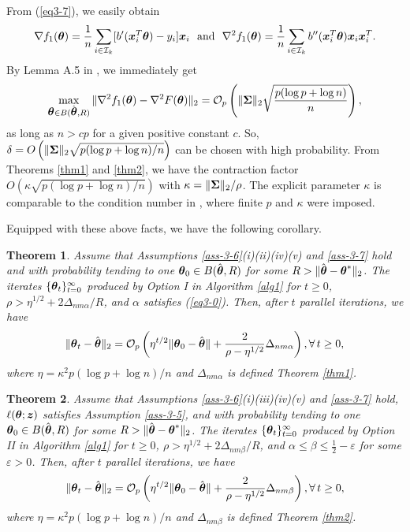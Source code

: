 \documentclass[12pt,a4paper]{article}%
\newtheorem{thm}{Theorem}[section]
\newcommand \vc[1]{{\mbox{\boldmath${#1}$}}}
\newcommand \vtheta{\vc \theta}
\newcommand \vZ{\vc z}
\numberwithin{equation}{section}
\newcommand{\sbr}[1]{\left(#1\right)}        %
\begin{document}
From (\ref{eq3-7}), we easily obtain
$$\nabla f_1(\vtheta)=\frac{1}{n}\sum_{i\in\mathcal{I}_k}[b'(\vc x_i^T\vtheta)-y_i]\vc x_i ~~\mathrm{and}~~\nabla^2 f_1(\vtheta)=\frac{1}{n}\sum_{i\in\mathcal{I}_k}b''(\vc x_i^T\vtheta)\vc x_i\vc x_i^T.$$
By Lemma A.5 in \cite{FanGuoWang2019}, we immediately  get
$$\max_{\vtheta\in B(\hat{\vtheta},R)}\|\nabla^2 f_1(\vtheta)-\nabla^2 F(\vtheta)\|_2=\mathcal{O}_p\sbr{\|\vc\Sigma\|_2\sqrt{\frac{p(\log p+\log n)}{n}}},$$
as long as $n>cp$ for a given positive constant $c$. So, $\delta=O\sbr{\|\vc\Sigma\|_2\sqrt{p(\log p+\log n)/n}}$ can be chosen with high probability. From Theorems \ref{thm1} and \ref{thm2}, we have the contraction factor $O\sbr{\kappa\sqrt{p(\log p+\log n)/n}}$ with $\kappa=\|\vc\Sigma\|_2/\rho$. The explicit parameter $\kappa$ is comparable to the condition number in \cite{JordanLeeYang2019}, where  finite $p$ and $\kappa$ were imposed.

Equipped with these above facts, we have the following corollary.

\begin{thm}\label{thm3}
Assume that Assumptions \ref{ass-3-6}(i)(ii)(iv)(v) and \ref{ass-3-7} hold and with probability tending to one $\vtheta_0\in B(\hat{\vtheta},R)$ for some $R>\|\hat{\vtheta}-\vtheta^*\|_2$. The iterates $\{\vtheta_t\}_{t=0}^\infty$ produced by Option I in Algorithm \ref{alg1} for $t\geq0$, $\rho>\eta^{1/2}+2\Delta_{nm\alpha}/R$, and $\alpha$ satisfies (\ref{eq3-0}). Then, after $t$ parallel iterations, we have
$$\|\vc\vtheta_t-\hat{\vtheta}\|_2=\mathcal{O}_p\sbr{\eta^{t/2}\|\vtheta_0-\hat{\vtheta}\|+\frac{2}{\rho-\eta^{1/2}}\Delta_{nm\alpha}}, \forall \,t\geq0,$$
where $\eta=\kappa^2p(\log p+\log n)/n$ and $\Delta_{nm\alpha}$ is defined Theorem \ref{thm1}.
\end{thm}

\begin{thm}\label{thm4}
Assume that Assumptions \ref{ass-3-6}(i)(iii)(iv)(v) and \ref{ass-3-7} hold, $\ell(\vtheta;\vZ)$ satisfies Assumption \ref{ass-3-5}, and with probability tending to one $\vtheta_0\in B(\hat{\vtheta},R)$ for some $R>\|\hat{\vtheta}-\vtheta^*\|_2$. The iterates $\{\vtheta_t\}_{t=0}^\infty$ produced by Option II in Algorithm \ref{alg1} for $t\geq0$, $\rho>\eta^{1/2}+2\Delta_{nm\beta}/R$, and $\alpha\leq\beta\leq \frac{1}{2}-\varepsilon$ for some $\varepsilon>0$. Then, after $t$ parallel iterations, we have
$$\|\vc\vtheta_t-\hat{\vtheta}\|_2=\mathcal{O}_p\sbr{\eta^{t/2}\|\vtheta_0-\hat{\vtheta}\|+\frac{2}{\rho-\eta^{1/2}}\Delta_{nm\beta}}, \forall\, t\geq0,$$
where $\eta=\kappa^2p(\log p+\log n)/n$ and $\Delta_{nm\beta}$ is defined Theorem \ref{thm2}.
\end{thm}
\end{document}
